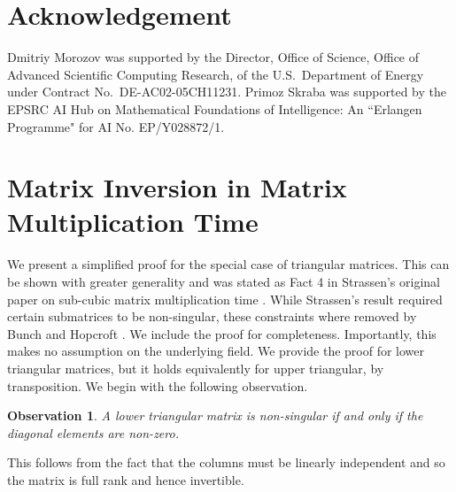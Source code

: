 \documentclass[10pt,a4paper]{article}
\newtheorem{observation}[theorem]{Observation}
\begin{document}
\section*{Acknowledgement}
Dmitriy Morozov was supported by the Director, Office of Science, Office of Advanced Scientific
 Computing Research, of the U.S.\ Department of Energy under Contract No.\ DE-AC02-05CH11231.
Primoz Skraba was supported by the EPSRC AI Hub on Mathematical Foundations of Intelligence: An ``Erlangen Programme" for AI No. EP/Y028872/1.




\appendix




\section{Matrix Inversion in Matrix Multiplication Time}\label{appendix:fastinversion}

We present a simplified proof for the special case of triangular matrices. This can be shown with greater generality and was stated as Fact 4 in Strassen's original
paper on sub-cubic matrix multiplication time \cite{strassen1969gaussian}. While Strassen's result required certain submatrices to be non-singular, these constraints where removed by Bunch and Hopcroft \cite{bunch1974triangular}. We include the proof for completeness.  Importantly, this makes no assumption on the underlying field. 
%
We provide the proof for lower triangular matrices, but it holds equivalently for upper triangular, by transposition. 
 We begin with the following observation.
 \begin{observation}
 A  lower triangular matrix is non-singular if and only if the diagonal elements are non-zero.
 \end{observation}
 This follows from the fact that the columns must be linearly independent and so the matrix is full rank and hence invertible. 
\end{document}
